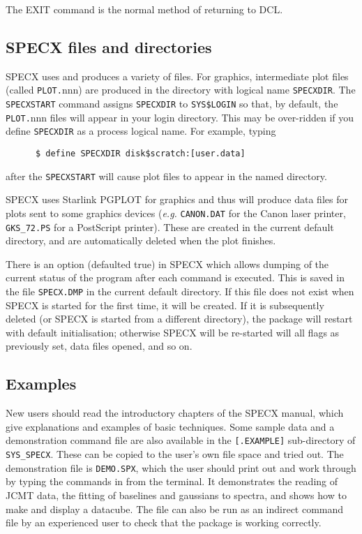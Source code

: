 The EXIT command is the normal method of returning to DCL.


\subsection {SPECX files and directories}

SPECX uses and produces a variety of files. For graphics, 
intermediate plot files (called {\tt PLOT.}nnn) are produced in the directory 
with logical name {\tt SPECXDIR}. The {\tt SPECXSTART} command assigns 
{\tt SPECXDIR} to {\tt SYS\$LOGIN} so that, 
by default, the {\tt PLOT.}nnn files will appear in 
your login directory. This may be over-ridden if you define 
{\tt SPECXDIR} as a process logical name. For example, typing

\begin{verbatim}
      $ define SPECXDIR disk$scratch:[user.data]
\end{verbatim}

after the {\tt SPECXSTART} will cause plot files to appear in the named
directory.

SPECX uses Starlink PGPLOT for graphics  and thus will produce data  files for
plots sent to some graphics devices ({\em e.g.} {\tt CANON.DAT} for the
Canon laser printer, {\tt GKS\_72.PS} for a PostScript printer). These
are created in the current default directory, and are automatically
deleted when the plot finishes.

There is an option (defaulted true) in SPECX which  allows dumping of the
current status of the program after each  command is executed. This is saved in
the file {\tt SPECX.DMP} in the  current default directory. If this file
does not exist when SPECX  is started for the first time, it will be
created. If it is
subsequently deleted (or SPECX is started from a different  directory), the
package will restart with default initialisation; otherwise SPECX will be
re-started will all flags as previously  set, data files opened, and so on. 


\subsection {Examples}

New users should read the introductory chapters of the SPECX manual,
which give explanations and examples of basic techniques. Some sample
data and a demonstration command file are also available in the
{\tt [.EXAMPLE]} sub-directory of {\tt SYS\_SPECX}. These can be copied
to the user's own
file space and tried out. The demonstration file is {\tt DEMO.SPX},
which the user should print out and work through by typing the commands
in from the terminal. It demonstrates the reading of JCMT data,
the fitting of baselines and gaussians to spectra, and shows how to make
and display a datacube. The file can also be run as an indirect command
file by an experienced user to check that the package is working correctly.


